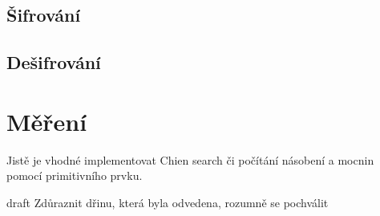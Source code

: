 \documentclass[thesis=M,czech,hidelinks]{FITthesis}[2012/06/26]
\newcommand{\0}{{\textcolor[gray]{0.75}{0}}}
\begin{document}
\subsection{Šifrování}

\subsection{Dešifrování}





\section{Měření}

Jistě je vhodné implementovat Chien search či počítání násobení a mocnin pomocí
primitivního prvku.



\begin{conclusion}
    draft \cite{Schanck}
    Zdůraznit dřinu, která byla odvedena, rozumně se pochválit
\end{conclusion}




\end{document}

